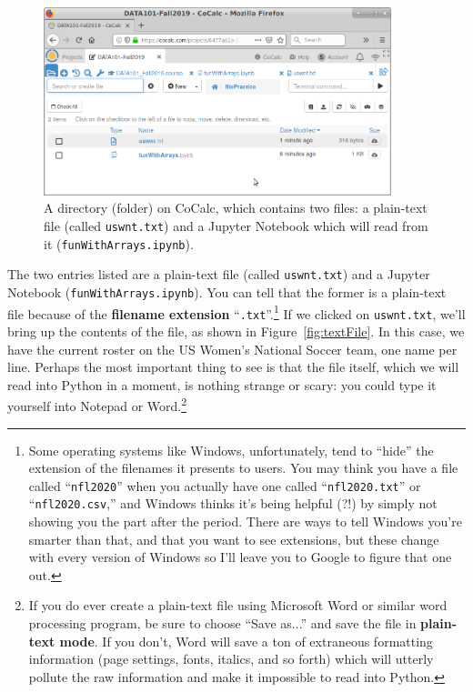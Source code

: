 \begin{figure}[ht]
\centering
\includegraphics[width=0.9\textwidth]{folder.png}
\medskip
\caption{A directory (folder) on CoCalc, which contains two files: a plain-text
file (called \texttt{uswnt.txt}) and a Jupyter Notebook which will read from it
(\texttt{funWithArrays.ipynb}).}
\label{fig:folder}
\end{figure}

\label{extensions}

The two entries listed are a plain-text file (called \texttt{uswnt.txt}) and a
Jupyter Notebook (\texttt{funWithArrays.ipynb}). You can tell that the former
is a plain-text file because of the \textbf{filename extension}
``\texttt{.txt}''.\footnote{Some operating systems like Windows, unfortunately,
tend to ``hide'' the extension of the filenames it presents to users. You may
think you have a file called ``\texttt{nfl2020}'' when you actually have one
called ``\texttt{nfl2020.txt}'' or ``\texttt{nfl2020.csv},'' and Windows thinks
it's being helpful (?!) by simply not showing you the part after the period.
There are ways to tell Windows you're smarter than that, and that you want to
see extensions, but these change with every version of Windows so I'll leave
you to Google to figure that one out.} If we clicked on \texttt{uswnt.txt},
we'll bring up the contents of the file, as shown in Figure~\ref{fig:textFile}.
In this case, we have the current roster on the US Women's National Soccer
team, one name per line. Perhaps the most important thing to see is that the
file itself, which we will read into Python in a moment, is nothing strange or
scary: you could type it yourself into Notepad or Word.\footnote{If you do ever
create a plain-text file using Microsoft Word or similar word processing
program, be sure to choose ``Save as...'' and save the file in
\textbf{plain-text mode}. If you don't, Word will save a ton of extraneous
formatting information (page settings, fonts, italics, and so forth) which will
utterly pollute the raw information and make it impossible to read into
Python.}

